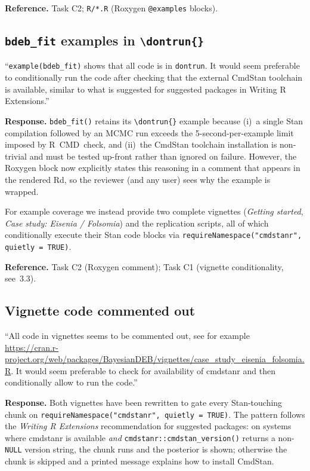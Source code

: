 \documentclass[11pt,a4paper]{article}
\newcommand{\code}[1]{\texttt{#1}}
\newcommand{\pkg}[1]{\textsf{#1}}
\begin{document}
\textbf{Reference.} Task C2; \code{R/*.R}
(Roxygen \code{@examples} blocks).

\subsection{\code{bdeb\_fit} examples in \code{\textbackslash dontrun\{\}}}

\begin{displayquote}
``\verb|example(bdeb_fit)| shows that all code is in
\code{dontrun}. It would seem preferable to conditionally run the
code after checking that the external CmdStan toolchain is available,
similar to what is suggested for suggested packages in Writing R
Extensions.''
\end{displayquote}

\textbf{Response.} \code{bdeb\_fit()} retains its
\code{\textbackslash dontrun\{\}} example because (i)~a single Stan
compilation followed by an MCMC run exceeds the 5-second-per-example
limit imposed by R~CMD~check, and (ii)~the CmdStan toolchain
installation is non-trivial and must be tested up-front rather than
ignored on failure. However, the Roxygen block now explicitly states
this reasoning in a comment that appears in the rendered Rd, so the
reviewer (and any user) sees why the example is wrapped.

For example coverage we instead provide two complete vignettes
(\emph{Getting started}, \emph{Case study: Eisenia / Folsomia}) and
the replication scripts, all of which conditionally execute their
Stan code blocks via
\verb|requireNamespace("cmdstanr", quietly = TRUE)|.

\textbf{Reference.} Task C2 (Roxygen comment); Task C1 (vignette
conditionality, see~3.3).

\subsection{Vignette code commented out}

\begin{displayquote}
``All code in vignettes seems to be commented out, see for
example
\url{https://cran.r-project.org/web/packages/BayesianDEB/vignettes/case_study_eisenia_folsomia.R}.
It would seem preferable to check for availability of \pkg{cmdstanr}
and then conditionally allow to run the code.''
\end{displayquote}

\textbf{Response.} Both vignettes have been rewritten to gate every
Stan-touching chunk on
\verb|requireNamespace("cmdstanr", quietly = TRUE)|. The pattern
follows the \emph{Writing R Extensions} recommendation for suggested
packages: on systems where \pkg{cmdstanr} is available
\emph{and} \code{cmdstanr::cmdstan\_version()} returns a
non-\code{NULL} version string, the chunk runs and the posterior is
shown; otherwise the chunk is skipped and a printed message explains
how to install CmdStan.
\end{document}

